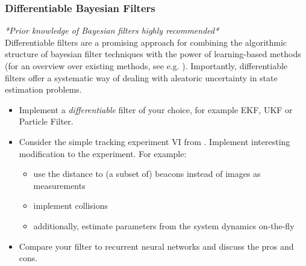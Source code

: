 \documentclass[a4paper]{article}
\begin{document}
\subsubsection{Differentiable Bayesian Filters}
\textit{*Prior knowledge of Bayesian filters highly recommended*}\\
Differentiable filters are a promising approach for combining the algorithmic structure of bayesian filter techniques with the power of learning-based methods (for an overview over existing methods, see e.g. \citet{kloss2021train}).
Importantly, differentiable filters offer a systematic way of dealing with aleatoric uncertainty in state estimation problems.
\begin{itemize}
  \item Implement a \textit{differentiable} filter of your choice, for example EKF, UKF or Particle Filter.
  \item Consider the simple tracking experiment VI from \citet{kloss2021train}. Implement interesting modification to the experiment. For example:
        \begin{itemize}
          \item use the distance to (a subset of) beacons instead of images as measurements
          \item implement collisions
          \item additionally, estimate parameters from the system dynamics on-the-fly
        \end{itemize}
  \item Compare your filter to recurrent neural networks and discuss the pros and cons.
\end{itemize}




\end{document}
